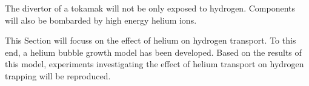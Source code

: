 The divertor of a tokamak will not be only exposed to hydrogen.
Components will also be bombarded by high energy helium ions.

This Section will focuss on the effect of helium on hydrogen transport.
To this end, a helium bubble growth model has been developed.
Based on the results of this model, experiments investigating the effect of helium transport on hydrogen trapping will be reproduced.

